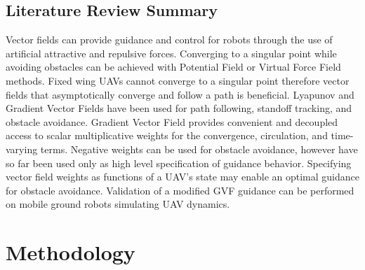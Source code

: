 \documentclass[numbered,pdftex]{ohio-etd}
\begin{document}
\section{Literature Review Summary}


Vector fields can provide guidance and control for robots through the use of artificial attractive and repulsive forces. Converging to a singular point while avoiding obstacles can be achieved with Potential Field or Virtual Force Field methods. Fixed wing UAVs cannot converge to a singular point therefore vector fields that asymptotically converge and follow a path is beneficial. Lyapunov and Gradient Vector Fields have been used for path following, standoff tracking, and obstacle avoidance. Gradient Vector Field provides convenient and decoupled access to scalar multiplicative weights for the convergence, circulation, and time-varying terms. Negative weights can be used for obstacle avoidance, however have so far been used only as high level specification of guidance behavior. Specifying vector field weights as functions of a UAV's state may enable an optimal guidance for obstacle avoidance. Validation of a modified GVF guidance can be performed on mobile ground robots simulating UAV dynamics.

\chapter{Methodology}

%
%
%
%
%
\end{document}
